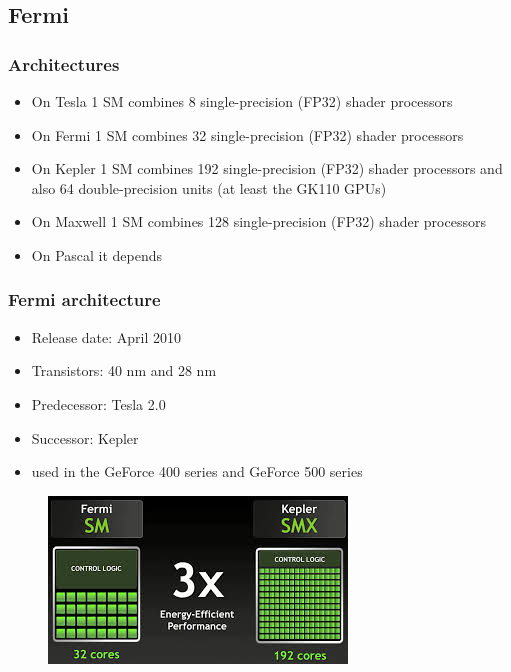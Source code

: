\documentclass{beamer}
\begin{document}
\subsection{Fermi}

\begin{frame}
\frametitle{Architectures}
\begin{itemize}
	\item {On Tesla 1 SM combines 8 single-precision (FP32) shader processors}
	\item {On Fermi 1 SM combines 32 single-precision (FP32) shader processors}
	\item{On Kepler 1 SM combines 192 single-precision (FP32) shader processors and also 64 double-precision units (at least the GK110 GPUs)}
	\item {On Maxwell 1 SM combines 128 single-precision (FP32) shader processors}
	\item {On Pascal it depends
	}	
\end{itemize}
\end{frame}
\begin{frame}
\frametitle{Fermi architecture}
\begin{itemize}
	\item Release date: April 2010
	\item Transistors: 40 nm and 28 nm
	\item Predecessor: Tesla 2.0
	\item Successor: Kepler
	\item  {used in the GeForce 400 series and GeForce 500 series}
\end{itemize}
\begin{figure}
	\centering
	\includegraphics[scale=0.7]{fermi5}
\end{figure}

\end{frame}		
\end{document}
